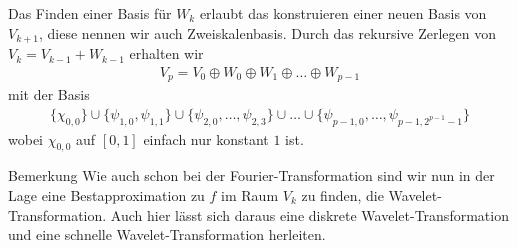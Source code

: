 Das Finden einer Basis für $W_{k}$ erlaubt das konstruieren einer neuen Basis von $V_{k+1}$, diese nennen wir 
auch Zweiskalenbasis. Durch das rekursive Zerlegen von $V_k=V_{k-1}+W_{k-1}$ erhalten wir 
%
\begin{align*}
  V_p = V_0 \oplus W_0 \oplus W_1 \oplus \dots \oplus W_{p-1}
\end{align*}
%
mit der Basis 
%
\begin{align*}
  \{\chi_{0,0}\}
  \cup \{\psi_{1,0}, \psi_{1,1}\}
  \cup \{\psi_{2,0},\dots,\psi_{2,3}\} 
  \cup \dots \cup\{\psi_{p-1,0}, \dots, \psi_{p-1,2^{p-1}-1}\}
\end{align*}
%
wobei $\chi_{0,0}$ auf $[0,1]$ einfach nur konstant $1$ ist.

\begin{colbox}{Bemerkung}
  Wie auch schon bei der Fourier-Transformation sind wir nun in der Lage eine Bestapproximation zu $f$ im Raum $V_k$ 
  zu finden, die Wavelet-Transformation. Auch hier lässt sich daraus eine diskrete Wavelet-Transformation und eine 
  schnelle Wavelet-Transformation herleiten. 
\end{colbox}